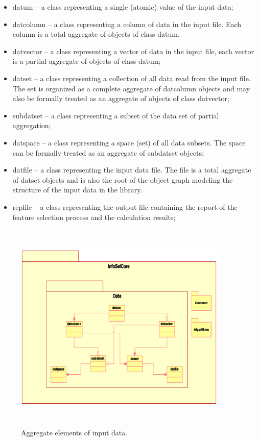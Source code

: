 \documentclass[a4paper,fleqn]{report}
\begin{document}
\begin{itemize}
\item datum -- a class representing a single (atomic) value of the input data;
\item datcolumn -- a class representing a column of data in the input file. Each column is a total aggregate of objects of class datum.
\item datvector -- a class representing a vector of data in the input file, each vector is a partial aggregate of objects of class datum;
\item datset -- a class representing a collection of all data read from the input file.
               The set is organized as a complete aggregate of datcolumn objects and 
               may also be formally treated as an aggregate of objects of class datvector;
\item subdatset -- a class representing a subset of the data set of partial aggregation;
\item datspace -- a class representing a space (set) of all data subsets. The space can be formally treated as an 
                 aggregate of subdatset objects;
\item datfile -- a class representing the input data file. The file is a total aggregate of datset objects and 
                is also the root of the object graph modeling the structure of the input data in the library.
\item repfile -- a class representing the output file containing the report of the feature selection process 
                and the calculation results;
\end{itemize}

\begin{figure}[!hb] \label{pic:lib-datastructure}
  \begin{center}
     \includegraphics[height=4in,width=4in]{./figs/Lib-datastructure.eps}
   \end{center}
   \caption{\small Aggregate elements of input data.}
\end{figure}
\end{document}
